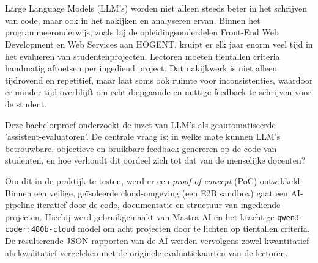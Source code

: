 
%
%
%
%
%

\chapter*{}

Large Language Models (LLM's) worden niet alleen steeds beter in het schrijven van code, maar ook in het nakijken en analyseren ervan. Binnen het programmeeronderwijs, zoals bij de opleidingsonderdelen Front-End Web Development en Web Services aan HOGENT, kruipt er elk jaar enorm veel tijd in het evalueren van studentenprojecten. Lectoren moeten tientallen criteria handmatig aftoetsen per ingediend project. Dat nakijkwerk is niet alleen tijdrovend en repetitief, maar laat soms ook ruimte voor inconsistenties, waardoor er minder tijd overblijft om echt diepgaande en nuttige feedback te schrijven voor de student.

\vspace{1em}

Deze bachelorproef onderzoekt de inzet van LLM's als geautomatiseerde 'assistent-evaluatoren'. De centrale vraag is: in welke mate kunnen LLM's betrouwbare, objectieve en bruikbare feedback genereren op de code van studenten, en hoe verhoudt dit oordeel zich tot dat van de menselijke docenten?

\vspace{1em}

Om dit in de praktijk te testen, werd er een \textit{proof-of-concept} (PoC) ontwikkeld. Binnen een veilige, geïsoleerde cloud-omgeving (een E2B sandbox) gaat een AI-pipeline iteratief door de code, documentatie en structuur van ingediende projecten. Hierbij werd gebruikgemaakt van Mastra AI en het krachtige \texttt{qwen3-coder:480b-cloud} model om acht projecten door te lichten op tientallen criteria. De resulterende JSON-rapporten van de AI werden vervolgens zowel kwantitatief als kwalitatief vergeleken met de originele evaluatiekaarten van de lectoren.

